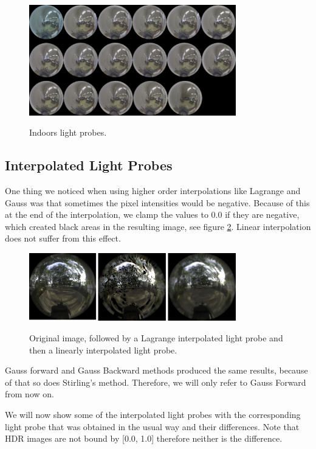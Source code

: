 \documentclass[conference]{acmsiggraph}
\begin{document}
	\begin{figure}[!ht]
		\caption{Indoors light probes.}
		\centering
		\includegraphics[width=9cm]{images/lightprobesint.png}
		\label{fig:lpint}
	\end{figure}

\subsection{Interpolated Light Probes}

One thing we noticed when using higher order interpolations like Lagrange and Gauss was that sometimes the pixel intensities would be negative. Because of this at the end of the interpolation, we clamp the values to 0.0 if they are negative, which created black areas in the resulting image, see figure \ref{fig:orlali}. Linear interpolation does not suffer from this effect.

	\begin{figure}[H]
		\caption{Original image, followed by a Lagrange interpolated light probe and then a linearly interpolated light probe.}
		\centering
		\includegraphics[width=9cm]{images/orlali.png}
		\label{fig:orlali}
	\end{figure}


Gauss forward and Gauss Backward methods produced the same results, because of that so does Stirling’s method. Therefore, we will only refer to Gauss Forward from now on.

We will now show some of the interpolated light probes with the corresponding light probe that was obtained in the usual way and their differences. Note that HDR images are not bound by [0.0, 1.0] therefore neither is the difference.
\end{document}
